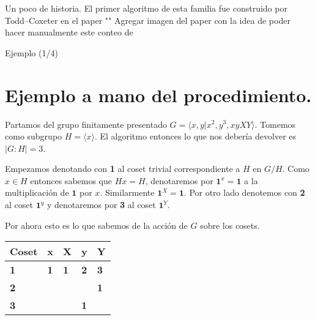 \documentclass[aspectratio=169, 9pt]{beamer}
\newcommand{\fp}{finitamente presentado }
\begin{document}
\begin{frame}[fragile]{Un poco de historia.}
	El primer algoritmo de esta familia fue construido por Todd--Coxeter en el paper ""
	\alert{Agregar imagen del paper}
	con la idea de poder hacer manualmente este conteo de  
\end{frame}

\begin{frame}[fragile]{Ejemplo (1/4)}
	\section{Ejemplo a mano del procedimiento.}
	Partamos del grupo \fp $G = \langle x, y | x^2, y^3, xyXY \rangle$.
	\pause
	Tomemos como subgrupo $H = \langle x \rangle$.
	\pause
	El algoritmo entonces lo que nos debería devolver es $|G:H| = 3$.
	\pause
	\medskip
	
	
	Empezamos denotando con \textbf{1} al coset trivial correspondiente a $H$ en $G/H$.
	\pause 
	Como $x \in H$ entonces sabemos que $Hx = H$, denotaremos por $\textbf{1}^x = \textbf{1}$ a la multiplicación de $\textbf{1}$ por $x$.
	Similarmente $\textbf{1}^{X} = \textbf{1}$.
	\pause
	Por otro lado denotemos con \textbf{2} al coset $\textbf{1}^y$ y denotaremos por \textbf{3} al coset $\textbf{1}^{Y}$.
	\pause
	
	Por ahora esto es lo que sabemos de la acción de $G$ sobre los cosets.
	\begin{table}[]
		\begin{tabular}{|l|l|l|l|l|}
			\hline
			Coset     & x          & X          & y          & Y          \\ \hline
			\textbf{1} & \textbf{1} & \textbf{1} & \textbf{2} & \textbf{3} \\ \hline
			\textbf{2} &            &            &            &  \textbf{1}          \\ \hline
			\textbf{3} &            &            &     \textbf{1}       &            \\ \hline
		\end{tabular}
	\end{table}
\end{frame}
\end{document}
